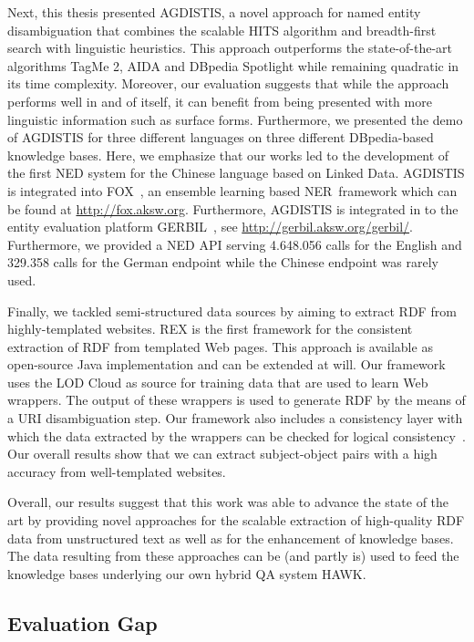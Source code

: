 Next, this thesis presented AGDISTIS, a novel approach for named entity disambiguation that combines the scalable \ac{HITS} algorithm and breadth-first search with linguistic heuristics.
This approach outperforms the state-of-the-art algorithms TagMe 2, AIDA and DBpedia Spotlight while remaining quadratic in its time complexity. 
Moreover, our evaluation suggests that while the approach performs well in and of itself, it can benefit from being presented with more linguistic information such as surface forms. 
Furthermore, we presented the demo of AGDISTIS for three different languages on three different DBpedia-based knowledge bases.
Here,  we emphasize that our works led to the development of the first \ac{NED} system for the Chinese language based on Linked Data.
AGDISTIS is integrated into FOX~\cite{FOX}, an ensemble learning based \ac{NER}~framework which can be found at \url{http://fox.aksw.org}. 
Furthermore, AGDISTIS is integrated in to the entity evaluation platform GERBIL~\cite{GERBIL}, see \url{http://gerbil.aksw.org/gerbil/}.
Furthermore, we provided a \ac{NED} API serving 4.648.056 calls for the English and 329.358 calls for the German endpoint while the Chinese endpoint was rarely used.


Finally, we tackled semi-structured data sources by aiming to extract \ac{RDF} from highly-templated websites. 
REX is the first framework for the consistent extraction of \ac{RDF} from templated Web pages. 
This approach is available as open-source Java implementation and can be extended at will.
Our framework uses the \ac{LOD} Cloud as source for training data that are used to learn Web wrappers. 
The output of these wrappers is used to generate \ac{RDF} by the means of a URI disambiguation step.
Our framework also includes a consistency layer with which the data extracted by the wrappers can be checked for logical consistency~\cite{buhmann2012}.
Our overall results show that we can extract subject-object pairs with a high accuracy from well-templated websites.

Overall, our results suggest that this work was able to advance the state of the art by providing novel approaches for the scalable extraction of high-quality RDF data from unstructured text as well as for the enhancement of knowledge bases. 
The data resulting from these approaches can be (and partly is) used to feed the knowledge bases underlying our own hybrid \ac{QA} system HAWK. 


\subsection*{Evaluation Gap}

